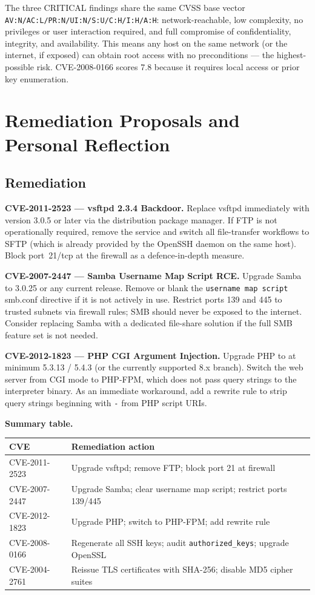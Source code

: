 \documentclass[11pt,a4paper]{article}
\begin{document}
\vspace{4pt}
The three CRITICAL findings share the same CVSS base vector
\texttt{AV:N/AC:L/PR:N/UI:N/S:U/C:H/I:H/A:H}: network-reachable, low complexity,
no privileges or user interaction required, and full compromise of confidentiality,
integrity, and availability.  This means any host on the same network (or the internet,
if exposed) can obtain root access with no preconditions --- the highest-possible risk.
CVE-2008-0166 scores 7.8 because it requires local access or prior key enumeration.


\section{Remediation Proposals and Personal Reflection}

\subsection{Remediation}

\noindent\textbf{CVE-2011-2523 --- vsftpd 2.3.4 Backdoor.}
Replace vsftpd immediately with version 3.0.5 or later via the distribution package
manager.  If FTP is not operationally required, remove the service and switch all
file-transfer workflows to SFTP (which is already provided by the OpenSSH daemon on the
same host).  Block port~21/tcp at the firewall as a defence-in-depth measure.

\noindent\textbf{CVE-2007-2447 --- Samba Username Map Script RCE.}
Upgrade Samba to 3.0.25 or any current release.  Remove or blank the
\texttt{username~map~script} smb.conf directive if it is not actively in use.  Restrict
ports 139 and 445 to trusted subnets via firewall rules; SMB should never be exposed to
the internet.  Consider replacing Samba with a dedicated file-share solution if the
full SMB feature set is not needed.

\noindent\textbf{CVE-2012-1823 --- PHP CGI Argument Injection.}
Upgrade PHP to at minimum 5.3.13 / 5.4.3 (or the currently supported 8.x branch).
Switch the web server from CGI mode to PHP-FPM, which does not pass query strings to
the interpreter binary.  As an immediate workaround, add a rewrite rule to strip
query strings beginning with \texttt{-} from PHP script URIs.

\noindent\textbf{Summary table.}

\small
\begin{tabularx}{\linewidth}{>{\ttfamily}l >{\raggedright\arraybackslash}X}
\toprule
\normalfont CVE & Remediation action \\
\midrule
CVE-2011-2523 & Upgrade vsftpd; remove FTP; block port 21 at firewall \\
CVE-2007-2447 & Upgrade Samba; clear username map script; restrict ports 139/445 \\
CVE-2012-1823 & Upgrade PHP; switch to PHP-FPM; add rewrite rule \\
CVE-2008-0166 & Regenerate all SSH keys; audit \texttt{authorized\_keys}; upgrade OpenSSL \\
CVE-2004-2761 & Reissue TLS certificates with SHA-256; disable MD5 cipher suites \\
\bottomrule
\end{tabularx}
\normalsize
\end{document}
